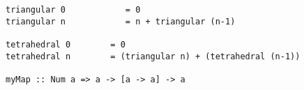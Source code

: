 \fontsize{8pt}{10pt}
\begin{verbatim}
triangular 0            = 0
triangular n            = n + triangular (n-1)

tetrahedral 0        = 0
tetrahedral n        = (triangular n) + (tetrahedral (n-1))

myMap :: Num a => a -> [a -> a] -> a  
\end{verbatim}